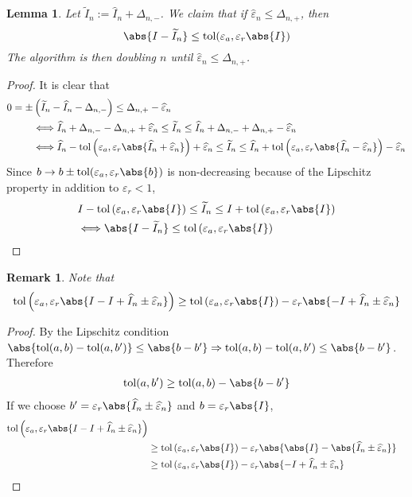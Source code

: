 \documentclass[]{elsarticle}
\newtheorem{lem}{Lemma}
\newtheorem{remark}{Remark}
\theoremstyle{definition}
\newcommand{\tol}{\text{tol}}
\begin{document}
\begin{lem}\label{first}
Let $\widetilde{I}_n:=\widehat{I}_n+\Delta_{n,-}$. We claim that if $\widehat{\varepsilon}_n\leq \Delta_{n,+}$, then
\[
\abs{I-\widetilde{I}_n}\leq \tol(\varepsilon_a,\varepsilon_r\abs{I})
\]
The algorithm is then doubling $n$ until $\widehat{\varepsilon}_n\leq \Delta_{n,+}$.
\end{lem}
\begin{proof}
It is clear that
\begin{align*}
0=\pm&\left(\widetilde{I}_n-\widehat{I}_n-\Delta_{n,-}\right)\leq \Delta_{n,+}-\widehat{\varepsilon}_n \\
&\Longleftrightarrow \widehat{I}_n+\Delta_{n,-} - \Delta_{n,+}+\widehat{\varepsilon}_n\leq \widetilde{I}_n \leq \widehat{I}_n+\Delta_{n,-}+ \Delta_{n,+}-\widehat{\varepsilon}_n\\
&\Longleftrightarrow \widehat{I}_n-\tol\left(\varepsilon_a,\varepsilon_r\abs{\widehat{I}_n+\widehat{\varepsilon}_n}\right)+\widehat{\varepsilon}_n\leq \widetilde{I}_n \leq \widehat{I}_n+\tol\left(\varepsilon_a,\varepsilon_r\abs{\widehat{I}_n-\widehat{\varepsilon}_n}\right)-\widehat{\varepsilon}_n
\end{align*}
Since $b\rightarrow b\pm \tol(\varepsilon_a,\varepsilon_r\abs{b})$ is non-decreasing because of the Lipschitz property in addition to $\varepsilon_r<1$,
\begin{align*}
&I-\tol\left(\varepsilon_a,\varepsilon_r\abs{I}\right)\leq \widetilde{I}_n  \leq I+\tol\left(\varepsilon_a,\varepsilon_r\abs{I}\right)\\
&\Longleftrightarrow \abs{I-\widetilde{I}_n}\leq\tol\left(\varepsilon_a,\varepsilon_r\abs{I}\right)
\end{align*}
\end{proof}

\begin{remark}
Note that
\[
\tol\left(\varepsilon_a,\varepsilon_r\abs{I-I+\widehat{I}_n\pm\widehat{\varepsilon}_n}\right)
\geq \tol\left(\varepsilon_a,\varepsilon_r\abs{I}\right)-\varepsilon_r\abs{-I+\widehat{I}_n\pm\widehat{\varepsilon}_n}
\]
\end{remark}
\begin{proof}
By the Lipschitz condition $\abs{\tol(a,b)-\tol(a,b')}\leq \abs{b-b'}\Rightarrow \tol(a,b)-\tol(a,b')\leq \abs{b-b'}$. Therefore
\begin{align*}
\tol(a,b')\geq\tol(a,b)-\abs{b-b'}
\end{align*}
If we choose $b'=\varepsilon_r\abs{\widehat{I}_n\pm\widehat{\varepsilon}_n}$ and $b=\varepsilon_r\abs{I}$,
\begin{align*}
\tol\left(\varepsilon_a,\varepsilon_r\abs{I-I+\widehat{I}_n\pm\widehat{\varepsilon}_n}\right)\\
&\geq \tol\left(\varepsilon_a,\varepsilon_r\abs{I}\right)-\varepsilon_r\abs{\abs{I}-\abs{\widehat{I}_n\pm\widehat{\varepsilon}_n}}\\
&\geq \tol\left(\varepsilon_a,\varepsilon_r\abs{I}\right)-\varepsilon_r\abs{-I+\widehat{I}_n\pm\widehat{\varepsilon}_n}
\end{align*}
\end{proof}
\end{document}
